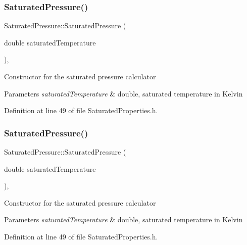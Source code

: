 \subsubsection{\texorpdfstring{Saturated\+Pressure()}{SaturatedPressure()}\hspace{0.1cm}{\footnotesize\ttfamily [1/3]}}
{\footnotesize\ttfamily Saturated\+Pressure\+::\+Saturated\+Pressure (\begin{DoxyParamCaption}\item[{double}]{saturated\+Temperature }\end{DoxyParamCaption})\hspace{0.3cm}{\ttfamily [inline]}, {\ttfamily [explicit]}}

Constructor for the saturated pressure calculator 
\begin{DoxyParams}{Parameters}
{\em saturated\+Temperature} & double, saturated temperature in Kelvin \\
\hline
\end{DoxyParams}


Definition at line 49 of file Saturated\+Properties.\+h.

\mbox{\label{class_saturated_pressure_a67020b0bb7588c643e12e256fa25e0bc}} 
\subsubsection{\texorpdfstring{Saturated\+Pressure()}{SaturatedPressure()}\hspace{0.1cm}{\footnotesize\ttfamily [2/3]}}
{\footnotesize\ttfamily Saturated\+Pressure\+::\+Saturated\+Pressure (\begin{DoxyParamCaption}\item[{double}]{saturated\+Temperature }\end{DoxyParamCaption})\hspace{0.3cm}{\ttfamily [inline]}, {\ttfamily [explicit]}}

Constructor for the saturated pressure calculator 
\begin{DoxyParams}{Parameters}
{\em saturated\+Temperature} & double, saturated temperature in Kelvin \\
\hline
\end{DoxyParams}


Definition at line 49 of file Saturated\+Properties.\+h.


